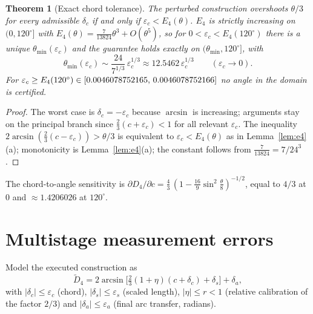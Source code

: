 \documentclass[11pt]{article}
\newtheorem{theorem}{Theorem}
\theoremstyle{definition}
\newcommand{\eps}{\varepsilon}
\newcommand{\Dfour}{D_4}
\begin{document}
\begin{theorem}[Exact chord tolerance]\label{thm:chord}
The perturbed construction overshoots $\theta/3$ for every admissible $\delta_c$ if and only if $\eps_c<E_4(\theta)$.
$E_4$ is strictly increasing on $(0,120^\circ]$ with $E_4(\theta)=\tfrac{7}{13824}\theta^3+O(\theta^5)$, so for $0<\eps_c<E_4(120^\circ)$ there is a unique $\theta_{\min}(\eps_c)$ and the guarantee holds exactly on $(\theta_{\min},120^\circ]$, with
\[
\theta_{\min}(\eps_c)\sim \frac{24}{7^{1/3}}\,\eps_c^{1/3}\approx12.5462\,\eps_c^{1/3}\qquad(\eps_c\to0).
\]
For $\eps_c\ge E_4(120^\circ)\in[\EcapLo,\,\EcapHi]$ no angle in the domain is certified.
\end{theorem}
\begin{proof}
The worst case is $\delta_c=-\eps_c$ because $\arcsin$ is increasing; arguments stay on the principal branch since $\tfrac23(c+\eps_c)<1$ for all relevant $\eps_c$.
The inequality $2\arcsin(\tfrac23(c-\eps_c))>\theta/3$ is equivalent to $\eps_c<E_4(\theta)$ as in Lemma~\ref{lem:e4}(a); monotonicity is Lemma~\ref{lem:e4}(a); the constant follows from $\tfrac{7}{13824}=7/24^3$.
\end{proof}
The chord-to-angle sensitivity is $\partial\Dfour/\partial c=\tfrac43\,(1-\tfrac{16}{9}\sin^2\tfrac\theta8)^{-1/2}$, equal to $4/3$ at $0$ and $\approx1.4206026$ at $120^\circ$.

\begin{table}[h]\centering\small

\caption{Robust-overshoot thresholds for input-chord error (unit radius). Enclosures are outward-rounded interval evaluations (Appendix~\ref{app:iv}); the cubic column is the leading-order estimate.}\label{tab:chord}
\end{table}

\section{Multistage measurement errors}\label{sec:multi}
Model the executed construction as
\[
\widetilde D_4=2\arcsin\!\Big[\tfrac23(1+\eta)(c+\delta_c)+\delta_s\Big]+\delta_a,
\]
with $|\delta_c|\le\eps_c$ (chord), $|\delta_s|\le\eps_s$ (scaled length), $|\eta|\le r<1$ (relative calibration of the factor $2/3$) and $|\delta_a|\le\eps_a$ (final arc transfer, radians).
\end{document}
